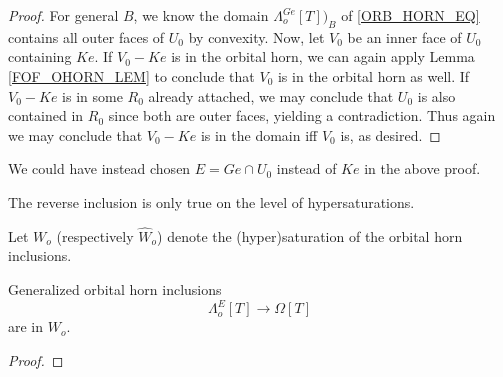 \documentclass[a4paper,10pt,draft]{article}%
\begin{document}
{\begin{proof}
      For general $B$, we know the domain $\Lambda^{G e}_o[T])_B$ of \eqref{ORB_HORN_EQ}
      contains all outer faces of $U_0$ by convexity.
      Now, let $V_0$ be an inner face of $U_0$ containing $K e$.
      If $V_0 - K e$ is in the orbital horn,
      we can again apply Lemma \ref{FOF_OHORN_LEM} to conclude that $V_0$ is in the orbital horn as well.
      If $V_0 - K e$ is in some $R_0$ already attached,
      we may conclude that $U_0$ is also contained in $R_0$ since both are outer faces, yielding a contradiction.
      Thus again we may conclude that $V_0 - K e$ is in the domain iff $V_0$ is, as desired.
\end{proof}

\begin{remark}
      We could have instead chosen $E = G e \cap U_0$ instead of $K e$ in the above proof.
\end{remark}

 }%




The reverse inclusion is only true on the level of hypersaturations.
\begin{definition}
      Let $W_o$ (respectively $\hat{W}_o$) denote the (hyper)saturation of the orbital horn inclusions.
\end{definition}

\begin{proposition}
      \label{GORB_OHORN_PROP}
      Generalized orbital horn inclusions
      \begin{equation}
            \Lambda^{E}_o[T] \to \Omega[T]
      \end{equation}
      are in $W_o$.
\end{proposition}
\begin{proof}
\end{proof}
\end{document}
